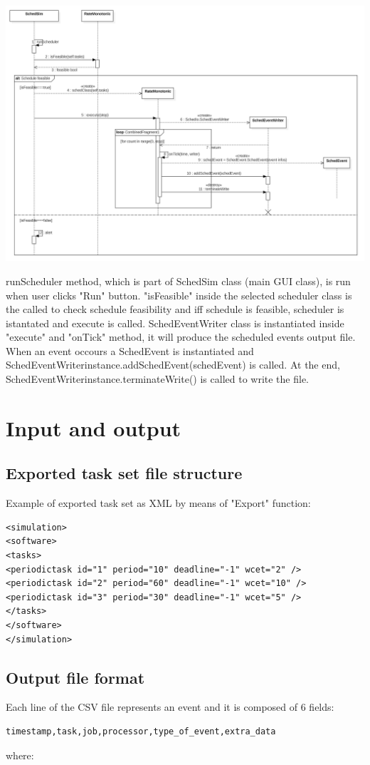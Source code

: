 \begin{center}
\includegraphics[width=1\textwidth]{SchedulerSequence.png}
\end{center}
runScheduler method, which is part of SchedSim class (main GUI class), is run when user clicks "Run" button. "isFeasible" inside the selected scheduler class is the called to check schedule feasibility and iff schedule is feasible, scheduler is istantated and execute is called. SchedEventWriter class is instantiated inside "execute" and "onTick" method, it will produce the scheduled events output file. When an event occours a SchedEvent is instantiated and SchedEventWriterinstance.addSchedEvent(schedEvent) is called. At the end, SchedEventWriterinstance.terminateWrite() is called to write the file.

\section{Input and output}
\subsection{Exported task set file structure}
Example of exported task set as XML by means of "Export" function:
\begin{verbatim}
<simulation>
<software>
<tasks>
<periodictask id="1" period="10" deadline="-1" wcet="2" />
<periodictask id="2" period="60" deadline="-1" wcet="10" />
<periodictask id="3" period="30" deadline="-1" wcet="5" />
</tasks>
</software>
</simulation>
\end{verbatim}
\subsection{Output file format}
Each line of the CSV file represents an event and it is composed of 6 fields:
\begin{verbatim}
timestamp,task,job,processor,type_of_event,extra_data
\end{verbatim}
where:


